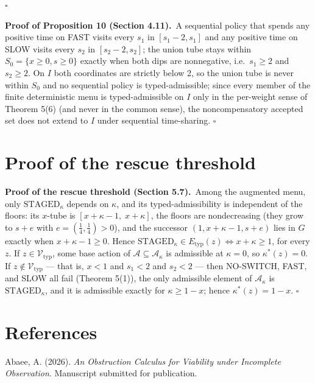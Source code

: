 \documentclass[3p,11pt]{elsarticle}
\begin{document}
\ensuremath{\square}

\textbf{Proof of Proposition 10 (Section 4.11).}\ A sequential policy that spends any positive time on FAST
visits every \(s_1\) in \([s_1 - 2, s_1]\) and any positive time on SLOW
visits every \(s_2\) in \([s_2 - 2, s_2]\); the union tube stays within
\(S_0 = \{x \ge 0, s \ge 0\}\) exactly when both dips are nonnegative,
i.e.~\(s_1 \ge 2\) and \(s_2 \ge 2\). On \(I\) both coordinates are
strictly below 2, so the union tube is never within \(S_0\) and no
sequential policy is typed-admissible; since every member of the finite
deterministic menu is typed-admissible on \(I\) only in the per-weight
sense of Theorem 5(6) (and never in the common sense), the
noncompensatory accepted set does not extend to \(I\) under sequential
time-sharing. \ensuremath{\square}

\section{Proof of the rescue threshold}

\textbf{Proof of the rescue threshold (Section 5.7).}\ Among the augmented menu, only \(\mathrm{STAGED}_\kappa\) depends on \(\kappa\), and its typed-admissibility is independent of the floors: its \(x\)-tube is \([x + \kappa - 1,\; x + \kappa]\), the floors are nondecreasing (they grow to \(s + e\) with \(e = (\tfrac14, \tfrac14) > 0\)), and the successor \((1, x + \kappa - 1, s + e)\) lies in \(G\) exactly when \(x + \kappa - 1 \ge 0\). Hence \(\mathrm{STAGED}_\kappa \in E_{\mathrm{typ}}(z) \iff x + \kappa \ge 1\), for every \(z\). If \(z \in \mathcal{V}_{\mathrm{typ}}\), some base action of \(\mathcal{A} \subseteq \mathcal{A}_\kappa\) is admissible at \(\kappa = 0\), so \(\kappa^*(z) = 0\). If \(z \notin \mathcal{V}_{\mathrm{typ}}\) --- that is, \(x < 1\) and \(s_1 < 2\) and \(s_2 < 2\) --- then NO-SWITCH, FAST, and SLOW all fail (Theorem 5(1)), the only admissible element of \(\mathcal{A}_\kappa\) is \(\mathrm{STAGED}_\kappa\), and it is admissible exactly for \(\kappa \ge 1 - x\); hence \(\kappa^*(z) = 1 - x\). \ensuremath{\square}


\section*{References}\label{references}

Abaee, A. (2026). \emph{An Obstruction Calculus for Viability under Incomplete Observation}. Manuscript submitted for publication.
\end{document}
